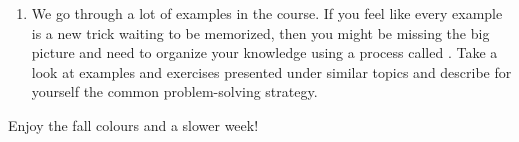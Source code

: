 \documentclass[../main.tex]{subfiles}
\begin{document}
\begin{enumerate}
    \item {} We go through a lot of examples in the course. If you feel like every example is a new trick waiting to be memorized, then you might be missing the big picture and need to organize your knowledge using a process called . Take a look at examples and exercises presented under similar topics and describe for yourself the common problem-solving strategy.
  \end{enumerate}


  \bigskip
  Enjoy the fall colours and a slower week! 
\end{document}
